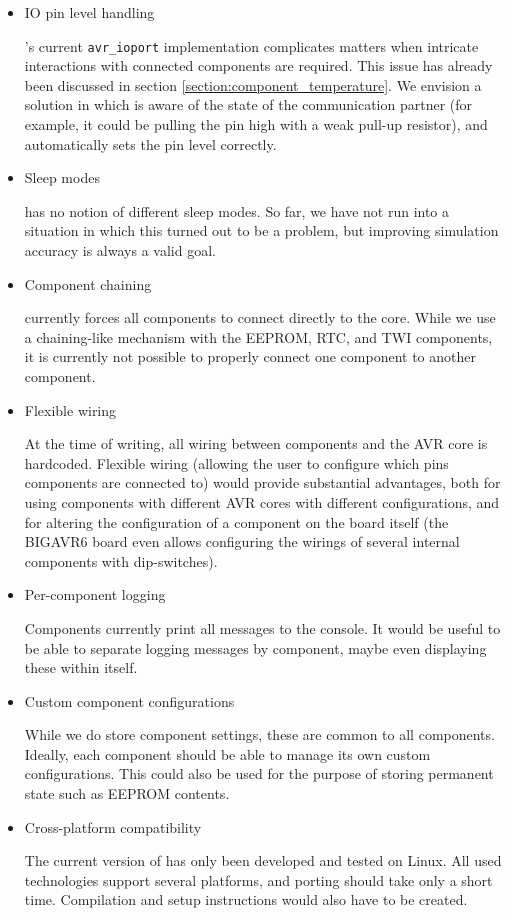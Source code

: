 \begin{itemize}
\item \ac{IO} pin level handling

\simavr's current \verb|avr_ioport| implementation complicates matters when
intricate interactions with connected components are required. This issue
has already been discussed in section \ref{section:component_temperature}.
We envision a solution in which \simavr is aware of the state of the communication
partner (for example, it could be pulling the pin high with a weak pull-up resistor),
and automatically sets the pin level correctly.

\item Sleep modes

\simavr has no notion of different sleep modes. So far, we have not run into a
situation in which this turned out to be a problem, but improving simulation
accuracy is always a valid goal.

\item Component chaining

\qsimavr currently forces all components to connect directly to the core.
While we use a chaining-like mechanism with the \ac{EEPROM}, \ac{RTC}, and \ac{TWI}
components, it is currently not possible to properly connect one component to
another component.

\item Flexible wiring

At the time of writing, all wiring between components and the \ac{AVR} core is
hardcoded. Flexible wiring (allowing the user to configure which pins components
are connected to) would provide substantial advantages, both for using
components with different \ac{AVR} cores with different configurations, and
for altering the configuration of a component on the board itself (the BIGAVR6
board even allows configuring the wirings of several internal components with
dip-switches).

\item Per-component logging

Components currently print all messages to the console. It would be useful to be
able to separate logging messages by component, maybe even displaying these within
\qsimavr itself.

\item Custom component configurations

While we do store component settings, these are common to all components.
Ideally, each component should be able to manage its own custom configurations.
This could also be used for the purpose of storing permanent state such as \ac{EEPROM}
contents.

\item Cross-platform compatibility

The current version of \qsimavr has only been developed and tested on Linux.
All used technologies support several platforms, and porting \qsimavr should
take only a short time. Compilation and setup instructions would also have to be
created.
\end{itemize}
